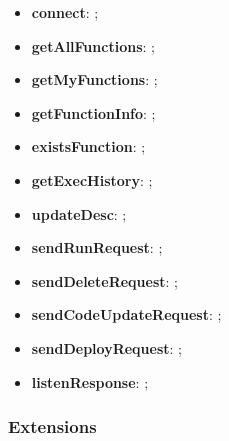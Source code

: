 				\begin{itemize}
					\item \textbf{connect}: ;
					\item \textbf{getAllFunctions}: ;
					\item \textbf{getMyFunctions}: ;
					\item \textbf{getFunctionInfo}: ;
					\item \textbf{existsFunction}: ;
					\item \textbf{getExecHistory}: ;
					\item \textbf{updateDesc}: ;
					\item \textbf{sendRunRequest}: ;
					\item \textbf{sendDeleteRequest}: ;
					\item \textbf{sendCodeUpdateRequest}: ;
					\item \textbf{sendDeployRequest}: ;
					\item \textbf{listenResponse}: ;
				\end{itemize}

		\subsubsection{Extensions}  %